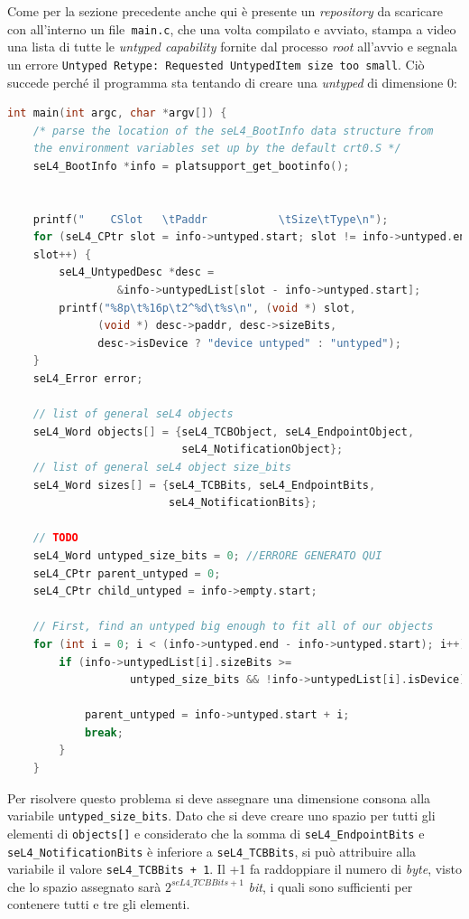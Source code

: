 Come per la sezione precedente anche qui è presente un \textit{repository} da scaricare con all'interno un file\texttt{ main.c}, che una volta compilato e avviato, stampa a video una lista di tutte le \textit{untyped capability} fornite dal processo \textit{root} all'avvio e segnala un errore \texttt{Untyped Retype: Requested UntypedItem size too small}. Ciò succede perché il programma sta tentando di creare una \textit{untyped} di dimensione 0:
\begin{lstlisting}[language=C++]
int main(int argc, char *argv[]) {
    /* parse the location of the seL4_BootInfo data structure from
    the environment variables set up by the default crt0.S */
    seL4_BootInfo *info = platsupport_get_bootinfo();


    printf("    CSlot   \tPaddr           \tSize\tType\n");
    for (seL4_CPtr slot = info->untyped.start; slot != info->untyped.end;
    slot++) {
        seL4_UntypedDesc *desc = 
                 &info->untypedList[slot - info->untyped.start];
        printf("%8p\t%16p\t2^%d\t%s\n", (void *) slot, 
              (void *) desc->paddr, desc->sizeBits, 
              desc->isDevice ? "device untyped" : "untyped");
    }
    seL4_Error error;

    // list of general seL4 objects
    seL4_Word objects[] = {seL4_TCBObject, seL4_EndpointObject,
                           seL4_NotificationObject};
    // list of general seL4 object size_bits
    seL4_Word sizes[] = {seL4_TCBBits, seL4_EndpointBits,
                         seL4_NotificationBits};
    
    // TODO
    seL4_Word untyped_size_bits = 0; //ERRORE GENERATO QUI
    seL4_CPtr parent_untyped = 0;
    seL4_CPtr child_untyped = info->empty.start;

    // First, find an untyped big enough to fit all of our objects
    for (int i = 0; i < (info->untyped.end - info->untyped.start); i++) {
        if (info->untypedList[i].sizeBits >= 
                   untyped_size_bits && !info->untypedList[i].isDevice) {
                   
            parent_untyped = info->untyped.start + i;
            break;
        }
    }
\end{lstlisting}

Per risolvere questo problema si deve assegnare una dimensione consona alla variabile \texttt{untyped\_size\_bits}. Dato che si deve creare uno spazio per tutti gli elementi di \texttt{objects[]} e considerato che la somma di \texttt{seL4\_EndpointBits} e \texttt{seL4\_NotificationBits} è inferiore a \texttt{seL4\_TCBBits}, si può attribuire alla variabile il valore \texttt{seL4\_TCBBits + 1}. Il +1 fa raddoppiare il numero di \textit{byte}, visto che lo spazio assegnato sarà $ 2^{seL4\_TCBBits + 1} $ \textit{bit}, i quali sono sufficienti per contenere tutti e tre gli elementi.

